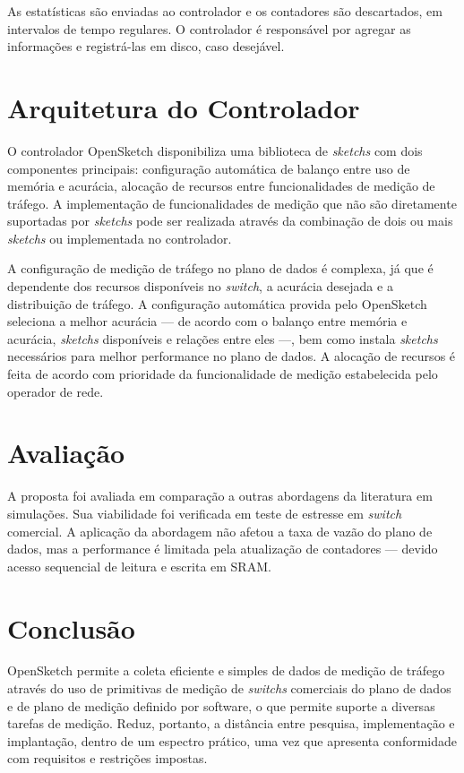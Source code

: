 As estatísticas são enviadas ao controlador e os contadores são descartados, em intervalos de tempo regulares. O controlador é responsável por agregar as informações e registrá-las em disco, caso desejável.

\section*{Arquitetura do Controlador}

O controlador OpenSketch disponibiliza uma biblioteca de \textit{sketchs} com dois componentes principais: configuração automática de balanço entre uso de memória e acurácia, alocação de recursos entre funcionalidades de medição de tráfego. A implementação de funcionalidades de medição que não são diretamente suportadas por \textit{sketchs} pode ser realizada através da combinação de dois ou mais \textit{sketchs} ou implementada no controlador.

A configuração de medição de tráfego no plano de dados é complexa, já que é dependente dos recursos disponíveis no \textit{switch}, a acurácia desejada e a distribuição de tráfego. A configuração automática provida pelo OpenSketch seleciona a melhor acurácia --- de acordo com o balanço entre memória e acurácia, \textit{sketchs} disponíveis e relações entre eles ---, bem como instala \textit{sketchs} necessários para melhor performance no plano de dados. A alocação de recursos é feita de acordo com prioridade da funcionalidade de medição estabelecida pelo operador de rede.


\section*{Avaliação}

A proposta foi avaliada em comparação a outras abordagens da literatura em simulações. Sua viabilidade foi verificada em teste de estresse em \textit{switch} comercial. A aplicação da abordagem não afetou a taxa de vazão do plano de dados, mas a performance é limitada pela atualização de contadores --- devido acesso sequencial de leitura e escrita em SRAM.


\section*{Conclusão}

OpenSketch permite a coleta eficiente e simples de dados de medição de tráfego através do uso de primitivas de medição de \textit{switchs} comerciais do plano de dados e de plano de medição definido por software, o que permite suporte a diversas tarefas de medição. Reduz, portanto, a distância entre pesquisa, implementação e implantação, dentro de um espectro prático, uma vez que apresenta conformidade com requisitos e restrições impostas.
